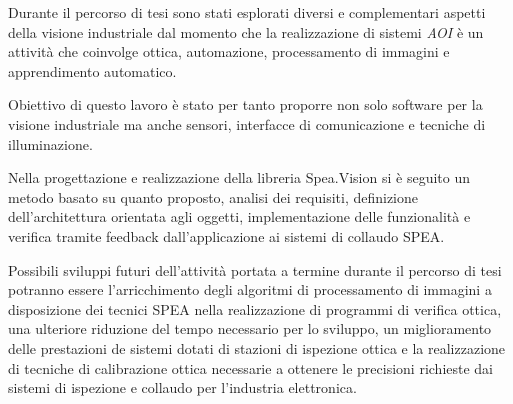 Durante il percorso di tesi sono stati esplorati diversi e complementari
aspetti della visione industriale dal momento che la realizzazione di sistemi
\emph{AOI} è un attività che coinvolge ottica, automazione, processamento di
immagini e apprendimento automatico.

Obiettivo di questo lavoro è stato per tanto proporre non solo software per
la visione industriale ma anche sensori, interfacce di comunicazione e
tecniche di illuminazione.

Nella progettazione e realizzazione della libreria Spea.Vision si è seguito un metodo basato 
su quanto proposto, analisi dei requisiti, definizione dell'architettura orientata agli oggetti, implementazione delle funzionalità e verifica tramite feedback dall'applicazione ai sistemi di collaudo SPEA.

Possibili sviluppi futuri dell'attività portata a termine durante il percorso
di tesi potranno essere l'arricchimento degli algoritmi di processamento di
immagini a disposizione dei tecnici SPEA nella realizzazione di programmi di
verifica ottica, una ulteriore riduzione del tempo necessario per lo
sviluppo, un miglioramento delle prestazioni de sistemi dotati di stazioni di
ispezione ottica e la realizzazione di tecniche di calibrazione ottica
necessarie a ottenere le precisioni richieste dai sistemi di ispezione e
collaudo per l'industria elettronica.



\endinput